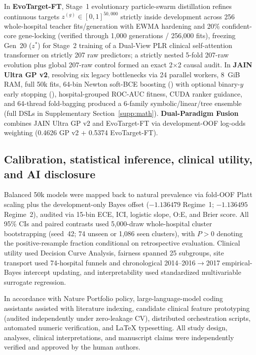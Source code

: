 In \textbf{EvoTarget-FT}, Stage~1 evolutionary particle-swarm distillation\cite{hinton2015distilling} refines continuous targets $z^{(g)} \in [0,1]^{50{,}000}$ strictly inside development across 256 whole-hospital teacher fits/generation with EWMA hardening and 20\% confident-core gene-locking (verified through 1,000 generations / 256,000 fits), freezing Gen~20 ($z^*$) for Stage~2 training of a Dual-View PLR clinical self-attention transformer\cite{gorishniy2021revisiting,gorishniy2022embeddings,izmailov2018swa} on strictly 207 raw predictors; a strictly nested 5-fold 207-raw evolution plus global 207-raw control formed an exact 2$\times$2 causal audit. In \textbf{JAIN Ultra GP v2}, resolving six legacy bottlenecks via 24 parallel workers, 8~GiB RAM, full 50k fits, 64-bin Newton soft-BCE boosting () with optional binary-$y$ early stopping (), hospital-grouped ROC-AUC fitness, CUDA ranker guidance, and 64-thread fold-bagging produced a 6-family symbolic/linear/tree ensemble (full DSLs in Supplementary Section~\ref{supp:math}). \textbf{Dual-Paradigm Fusion} combines JAIN Ultra GP v2 and EvoTarget-FT via development-OOF log-odds weighting (0.4626 GP v2 $+$ 0.5374 EvoTarget-FT).

\subsection{Calibration, statistical inference, clinical utility, and AI disclosure}
Balanced 50k models were mapped back to natural prevalence via fold-OOF Platt scaling\cite{platt1999probabilistic} plus the development-only Bayes offset ($-1.136479$ Regime~1; $-1.136495$ Regime~2),\cite{king2001logistic,saerens2002adjusting} audited via 15-bin ECE,\cite{guo2017calibration,vancalster2019calibration} ICI,\cite{austin2019ici} logistic slope, O:E, and Brier score. All 95\% CIs and paired contrasts used 5,000-draw whole-hospital cluster bootstrapping\cite{davison1997bootstrap,obuchowski1997clustered} (seed~42; 74 unseen or 1,086 seen clusters), with $P>0$ denoting the positive-resample fraction conditional on retrospective evaluation. Clinical utility used Decision Curve Analysis,\cite{vickers2006decision} fairness spanned 25 subgroups, site transport used 74-hospital funnels and chronological 2014--2016$\to$2017 empirical-Bayes intercept updating, and interpretability used standardized multivariable surrogate regression.

In accordance with Nature Portfolio policy, large-language-model coding assistants assisted with literature indexing, candidate clinical feature prototyping (audited independently under zero-leakage CV), distributed orchestration scripts, automated numeric verification, and LaTeX typesetting. All study design, analyses, clinical interpretations, and manuscript claims were independently verified and approved by the human authors.
